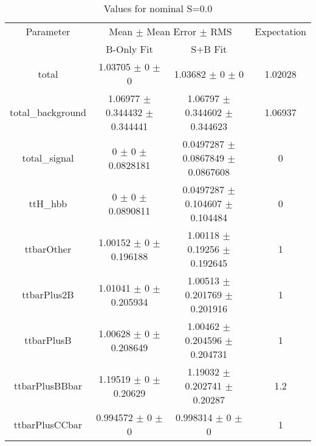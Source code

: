 \begin{table}
\centering
\caption{Values for nominal S=0.0}
\begin{tabular}{cccc}
\toprule
Parameter & \multicolumn{2}{c}{Mean $\pm$ Mean Error $\pm$ RMS} & Expectation\\
 & B-Only Fit & S+B Fit & \\
\midrule
total & \num{1.03705} $\pm$ \num{0} $\pm$ \num{0} & \num{1.03682} $\pm$ \num{0} $\pm$ \num{0} & \num{1.02028}\\
total\_background & \num{1.06977} $\pm$ \num{0.344432} $\pm$ \num{0.344441} & \num{1.06797} $\pm$ \num{0.344602} $\pm$ \num{0.344623} & \num{1.06937}\\
total\_signal & \num{0} $\pm$ \num{0} $\pm$ \num{0.0828181} & \num{0.0497287} $\pm$ \num{0.0867849} $\pm$ \num{0.0867608} & \num{0}\\
ttH\_hbb & \num{0} $\pm$ \num{0} $\pm$ \num{0.0890811} & \num{0.0497287} $\pm$ \num{0.104607} $\pm$ \num{0.104484} & \num{0}\\
ttbarOther & \num{1.00152} $\pm$ \num{0} $\pm$ \num{0.196188} & \num{1.00118} $\pm$ \num{0.19256} $\pm$ \num{0.192645} & \num{1}\\
ttbarPlus2B & \num{1.01041} $\pm$ \num{0} $\pm$ \num{0.205934} & \num{1.00513} $\pm$ \num{0.201769} $\pm$ \num{0.201916} & \num{1}\\
ttbarPlusB & \num{1.00628} $\pm$ \num{0} $\pm$ \num{0.208649} & \num{1.00462} $\pm$ \num{0.204596} $\pm$ \num{0.204731} & \num{1}\\
ttbarPlusBBbar & \num{1.19519} $\pm$ \num{0} $\pm$ \num{0.20629} & \num{1.19032} $\pm$ \num{0.202741} $\pm$ \num{0.20287} & \num{1.2}\\
ttbarPlusCCbar & \num{0.994572} $\pm$ \num{0} $\pm$ \num{0} & \num{0.998314} $\pm$ \num{0} $\pm$ \num{0} & \num{1}\\
\bottomrule
\end{tabular}
\end{table}